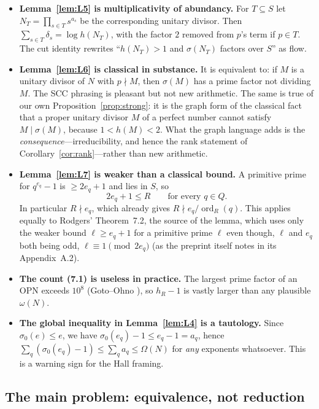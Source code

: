 \documentclass[11pt]{article}
\theoremstyle{definition}
\theoremstyle{remark}
\DeclareMathOperator{\ord}{ord}
\begin{document}
\begin{itemize}[leftmargin=1.5em]
\item \textbf{Lemma~\ref{lem:L5} is multiplicativity of abundancy.} For
  $T\subseteq S$ let $N_T=\prod_{s\in T}s^{a_s}$ be the corresponding
  unitary divisor. Then $\sum_{s\in T}\delta_s=\log h(N_T)$, with the
  factor $2$ removed from $p$'s term if $p\in T$. The cut identity
  rewrites ``$h(N_T)>1$ and $\sigma(N_T)$ factors over $S$'' as flow.

\item \textbf{Lemma~\ref{lem:L6} is classical in substance.} It is
  equivalent to: if $M$ is a unitary divisor of $N$ with $p\nmid M$, then
  $\sigma(M)$ has a prime factor not dividing $M$. The SCC phrasing is
  pleasant but not new arithmetic.  The same is true of our own
  Proposition~\ref{prop:strong}: it is the graph form of the classical fact
  that a proper unitary divisor $M$ of a perfect number cannot satisfy
  $M\mid\sigma(M)$, because $1<h(M)<2$.  What the graph language adds is the
  \emph{consequence}---irreducibility, and hence the rank statement of
  Corollary~\ref{cor:rank}---rather than new arithmetic.

\item \textbf{Lemma~\ref{lem:L7} is weaker than a classical bound.} A
  primitive prime for $q^{e_q}-1$ is $\ge 2e_q+1$ and lies in $S$, so
  \[
  2e_q+1\le R\qquad\text{for every }q\in Q.
  \]
  In particular $R\nmid e_q$, which already gives $R\nmid e_q/\ord_R(q)$.
  This applies equally to Rodgers' Theorem~7.2, the source of the lemma,
  which uses only the weaker bound $\ell\ge e_q+1$ for a primitive prime
  $\ell$ even though, $\ell$ and $e_q$ both being odd, $\ell\equiv1\pmod{2e_q}$
  (as the preprint itself notes in its Appendix~A.2).

\item \textbf{The count (7.1) is useless in practice.} The largest prime
  factor of an OPN exceeds $10^8$ (Goto--Ohno \cite{GotoOhno}), so
  $h_R-1$ is vastly larger than any plausible $\omega(N)$.

\item \textbf{The global inequality in Lemma~\ref{lem:L4} is a
  tautology.} Since $\sigma_0(e)\le e$, we have $\sigma_0(e_q)-1\le e_q-1=a_q$,
  hence $\sum_q(\sigma_0(e_q)-1)\le\sum_q a_q\le\Omega(N)$ for \emph{any}
  exponents whatsoever. This is a warning sign for the Hall framing.
\end{itemize}

\subsection{The main problem: equivalence, not reduction}
\end{document}

